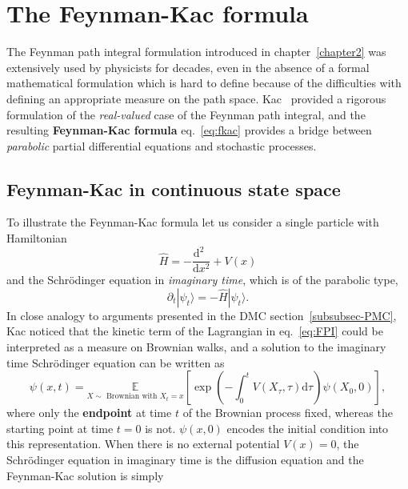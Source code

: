 \newpage
\section{The Feynman-Kac formula}
\label{subsec:fk-fk}
The Feynman path integral formulation introduced in chapter~\ref{chapter2} was extensively used by physicists for decades, even in the absence of a formal mathematical formulation which is hard to define because of the difficulties with defining an appropriate measure on the path space. Kac~\cite{kac1949distributions} provided a rigorous formulation of the \textit{real-valued} case of the Feynman path integral, and the resulting \textbf{Feynman-Kac formula} eq.~\eqref{eq:fkac} provides a bridge between \emph{parabolic} partial differential equations and stochastic processes. 

\subsection{Feynman-Kac in continuous state space}
\label{subsec:FK_in_continuous_space}
To illustrate the Feynman-Kac formula let us consider a single particle with Hamiltonian
\begin{equation}
	\hat{H} = -\frac{\mathrm{d}^2~~}{\mathrm{d}x^2} + V(x)
\end{equation}
and the Schr\" odinger equation in \textit{imaginary time}, which is of the parabolic type, 
\begin{equation}
	\label{eq:imag_sch}
	\partial_t | \psi_t \rangle = - \hat{H} | \psi_t \rangle.
\end{equation}
In close analogy to arguments presented in the DMC section~\ref{subsubsec-PMC}, Kac noticed that the kinetic term of the Lagrangian in eq.~\eqref{eq:FPI} could be interpreted as a measure on Brownian walks, and a solution to the imaginary time Schr\" odinger equation can be written as
\begin{equation}
	\label{eq:fkac}
	\psi(x, t)=\underset{X \sim \text { Brownian with } X_{t}=x}{\mathbb{E}}
	\left[\exp \left(-\int_{0}^{t}  V\left(X_{\tau}, \tau \right) \mathrm{d}\tau \right) \psi\left(X_{0}, 0\right)\right],
\end{equation}
where only the \textbf{endpoint} at time $t$ of the Brownian process fixed, whereas the starting point at time $t=0$ is not. $\psi (x, 0)$ encodes the initial condition into this representation. When there is no external potential $V(x) = 0$, the Schr\" odinger equation in imaginary time is the diffusion equation and the Feynman-Kac solution is simply
